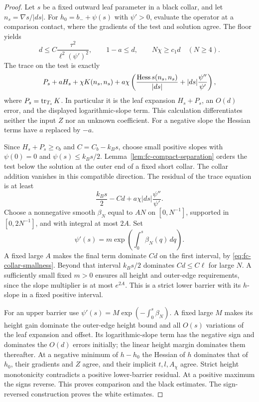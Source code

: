 \begin{proof}
Let $s$ be a fixed outward leaf parameter in a black collar, and
let $n_s=\nabla s/|ds|$.  For $h_0=b_-+\psi(s)$ with $\psi'>0$,
evaluate the operator at a comparison contact, where the gradients
of the test and solution agree.  The floor yields
\begin{equation}\label{eq:fc-collar-smallness}
 d\le C\frac{\tau^2}{\ell^2(\psi')^2},\qquad
 1-a\le d,\qquad N\chi\ge c_1d\quad(N\ge4).
\end{equation}
The trace on the test is exactly
\begin{equation}\label{eq:fc-collar-trace}
 P_s+aH_s+\chi K(n_s,n_s)
 +a\chi\left(
       \frac{\operatorname{Hess} s(n_s,n_s)}{|ds|}
                   +|ds|\frac{\psi''}{\psi'}\right),
\end{equation}
where $P_s=\operatorname{tr}_{T_s}K$.  In particular it is the leaf expansion
$H_s+P_s$, an $O(d)$ error, and the displayed logarithmic-slope
term.  This calculation differentiates neither the input $Z$ nor
an unknown coefficient.  For a negative slope the Hessian terms
have $a$ replaced by $-a$.

Since $H_s+P_s\ge c_b$ and $C=C_b-k_Bs$, choose small positive
slopes with $\psi(0)=0$ and $\psi(s)\le k_Bs/2$.
Lemma~\ref{lem:fc-compact-separation} orders the test below the
solution at the outer end of a fixed short collar.  The collar
addition vanishes in this compatible direction.  The residual of
the trace equation is at least
\[
 \frac{k_Bs}{2}-Cd+a\chi|ds|\frac{\psi''}{\psi'}.
\]
Choose a nonnegative smooth $\beta_N$ equal to $AN$ on
$[0,N^{-1}]$, supported in $[0,2N^{-1}]$, and with integral at most
$2A$.  Set
\[
 \psi'(s)=m\exp\!\left(\int_0^s\beta_N(q)\,dq\right).
\]
A fixed large $A$ makes the final term dominate $Cd$ on the first
interval, by \eqref{eq:fc-collar-smallness}.  Beyond that interval
$k_Bs/2$ dominates $Cd\le C\ell$ for large $N$.  A sufficiently
small fixed $m>0$ ensures all height and outer-edge requirements,
since the slope multiplier is at most $e^{2A}$.  This is a strict
lower barrier with its $h$-slope in a fixed positive interval.

For an upper barrier use
$\psi'(s)=M\exp(-\int_0^s\beta_N)$.
A fixed large $M$ makes its height gain dominate the outer-edge
height bound and all $O(s)$ variations of the leaf expansion and
offset.  Its logarithmic-slope term has the negative sign and
dominates the $O(d)$ errors initially; the linear height margin
dominates them thereafter.  At a negative minimum of $h-h_0$ the
Hessian of $h$ dominates that of $h_0$, their gradients and $Z$
agree, and their implicit $t,l,A_\chi$ agree.  Strict height
monotonicity contradicts a positive lower-barrier residual.
At a positive maximum the signs reverse.  This proves comparison
and the black estimates.  The sign-reversed construction proves
the white estimates.


\end{proof}
